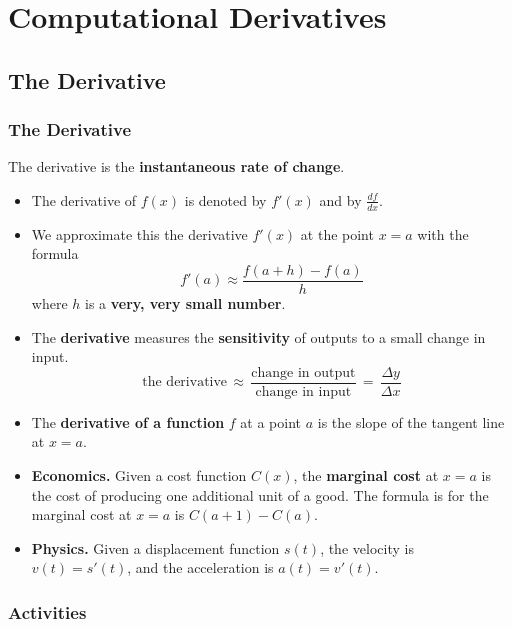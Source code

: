 \documentclass[
]{book}
\begin{document}
\hypertarget{part-computational-derivatives}{%
\part{Computational Derivatives}\label{part-computational-derivatives}}

\hypertarget{the-derivative}{%
\chapter{The Derivative}\label{the-derivative}}

\hypertarget{the-derivative-1}{%
\section{The Derivative}\label{the-derivative-1}}

The derivative is the \textbf{instantaneous rate of change}.

\begin{itemize}
\item
  The derivative of \(f(x)\) is denoted by \(f'(x)\) and by \(\displaystyle{\frac{df}{dx}}\).
\item
  We approximate this the derivative \(f'(x)\) at the point \(x=a\) with the formula
  \[
   f'(a)  \approx \frac{f(a+h) - f(a)}{h} 
  \]
  where \(h\) is a \textbf{very, very small number}.
\item
  The \textbf{derivative} measures the \textbf{sensitivity} of outputs to a small change in input.
  \[
  \text{the derivative} \, \approx \, \frac{\text{change in output}}{\text{change in input}} \, = \, \frac{\Delta y}{\Delta x}
  \]
\item
  The \textbf{derivative of a function} \(f\) at a point \(a\) is the slope of the tangent line at \(x=a\).
\item
  \textbf{Economics.} Given a cost function \(C(x)\), the \textbf{marginal cost} at \(x=a\) is the cost of producing one additional unit of a good. The formula is for the marginal cost at \(x=a\) is \(C(a+1)-C(a)\).
\item
  \textbf{Physics.} Given a displacement function \(s(t)\), the velocity is \(v(t) = s'(t)\), and the acceleration is \(a(t)=v'(t)\).
\end{itemize}

\hypertarget{activities-10}{%
\section{Activities}\label{activities-10}}
\end{document}
